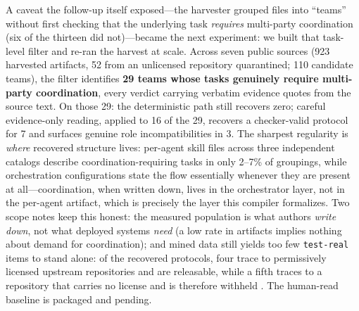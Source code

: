 \documentclass{article}
\begin{document}
A caveat the follow-up itself exposed---the harvester grouped files into ``teams'' without first checking that the underlying task \emph{requires} multi-party coordination (six of the thirteen did not)---became the next experiment: we built that task-level filter and re-ran the harvest at scale. Across seven public sources (923 harvested artifacts, 52 from an unlicensed repository quarantined; 110 candidate teams), the filter identifies \textbf{29 teams whose tasks genuinely require multi-party coordination}, every verdict carrying verbatim evidence quotes from the source text. On those 29: the deterministic path still recovers zero; careful evidence-only reading, applied to 16 of the 29, recovers a checker-valid protocol for 7 and surfaces genuine role incompatibilities in 3. The sharpest regularity is \emph{where} recovered structure lives: per-agent skill files across three independent catalogs describe coordination-requiring tasks in only 2--7\% of groupings, while orchestration configurations state the flow essentially whenever they are present at all---coordination, when written down, lives in the orchestrator layer, not in the per-agent artifact, which is precisely the layer this compiler formalizes. Two scope notes keep this honest: the measured population is what authors \emph{write down}, not what deployed systems \emph{need} (a low rate in artifacts implies nothing about demand for coordination); and mined data still yields too few \texttt{test-real} items to stand alone: of the recovered protocols, four trace to permissively licensed upstream repositories and are releasable, while a fifth traces to a repository that carries no license and is therefore withheld \citep{minedskillssources}. The human-read baseline is packaged and pending.
\end{document}
